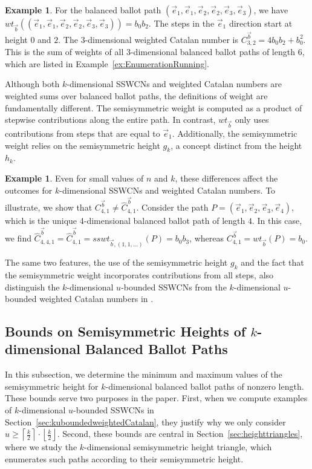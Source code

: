 \documentclass[11pt]{article}
\theoremstyle{remark}
\theoremstyle{definition}
\newtheorem{example}[theorem]{Example}
\begin{document}
\begin{example}
For the balanced ballot path $(\vec{e}_1, \vec{e}_1, \vec{e}_2, \vec{e}_2, \vec{e}_3, \vec{e}_3)$, we have $wt_{\vec{b}}((\vec{e}_1, \vec{e}_1, \vec{e}_2, \vec{e}_2, \vec{e}_3, \vec{e}_3)) = b_0b_2$. The steps in the $\vec{e}_1$ direction start at height $0$ and $2$. The $3$-dimensional weighted Catalan number is $C_{3, 2}^{\vec{b}} = 4b_0b_2 + b_0^2$. This is the sum of weights of all 3-dimensional balanced ballot paths of length $6$, which are listed in Example~\ref{ex:EnumerationRunning}.
\end{example}

Although both $k$-dimensional SSWCNs and weighted Catalan numbers are weighted sums over balanced ballot paths, the definitions of weight are fundamentally different. The semisymmetric weight is computed as a product of stepwise contributions along the entire path. In contrast, $wt_{\vec{b}}$ only uses contributions from steps that are equal to $\vec{e}_1$. Additionally, the semisymmetric weight relies on the semisymmetric height $g_k$, a concept distinct from the height $h_k$.

\begin{example}\label{ex:WhyNotTheSame}
Even for small values of $n$ and $k$, these differences affect the outcomes for $k$-dimensional SSWCNs and weighted Catalan numbers. To illustrate, we show that $C_{4, 1}^{\vec{b}} \neq \widehat{C}_{4, 1}^{\vec{b}}$. Consider the path $P = (\vec{e}_1, \vec{e}_2, \vec{e}_3, \vec{e}_4)$, which is the unique 4-dimensional balanced ballot path of length $4$. In this case, we find $\widehat{C}_{4, 4, 1}^{\vec{b}} = \widehat{C}_{4, 1}^{\vec{b}} = sswt_{\vec{b}, (1, 1, \dots)}(P) = b_0 b_3$, whereas $C_{4, 1}^{\vec{b}} = wt_{\vec{b}}(P) = b_0$.
\end{example}
The same two features, the use of the semisymmetric height $g_k$ and the fact that the semisymmetric weight incorporates contributions from all steps, also distinguish the $k$-dimensional $u$-bounded SSWCNs from the $k$-dimensional $u$-bounded weighted Catalan numbers in \cite{MR5034574}.
\subsection{Bounds on Semisymmetric Heights of \texorpdfstring{$k$}{k}-dimensional Balanced Ballot Paths}\label{sec:BasicObservations}

In this subsection, we determine the minimum and maximum values of the semisymmetric height for $k$-dimensional balanced ballot paths of nonzero length. These bounds serve two purposes in the paper. First, when we compute examples of $k$-dimensional $u$-bounded SSWCNs in Section~\ref{sec:kuboundedweightedCatalan}, they justify why we only consider $u \geq \left \lceil \frac{k}{2} \right\rceil \cdot \left \lfloor \frac{k}{2} \right\rfloor$. Second, these bounds are central in Section~\ref{sec:heighttriangles}, where we study the $k$-dimensional semisymmetric height triangle, which enumerates such paths according to their semisymmetric height.
\end{document}
